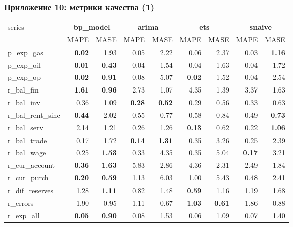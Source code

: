 \documentclass[9pt]{beamer}
\begin{document}
\begin{frame}
\frametitle{Приложение 10: метрики качества (1)}	
	\begin{center}
		\footnotesize
		\begin{tabular}{l|rr|rr|rr|rr}
			\toprule
			\multirow{2}{*}{series}&\multicolumn{2}{c|}{\textbf{bp\_model}}&\multicolumn{2}{c|}{\textbf{arima}}&\multicolumn{2}{c|}{\textbf{ets}}&\multicolumn{2}{c}{\textbf{snaive}}\\
			
			&MAPE & MASE & MAPE & MASE & MAPE & MASE & MAPE & MASE \\ 
			\midrule
			p\_exp\_gas & \textbf{0.02} & 1.93 & 0.05 & 2.22 & 0.06 & 2.37 & 0.03 & \textbf{1.16} \\ 
			p\_exp\_oil & \textbf{0.01} & \textbf{0.43} & 0.04 & 1.54 & 0.04 & 1.63 & 0.04 & 1.72 \\ 
			p\_exp\_op & \textbf{0.02} & \textbf{0.91} & 0.08 & 5.07 & \textbf{0.02} & 1.52 & 0.04 & 2.54 \\ 
			r\_bal\_fin & \textbf{1.61} & \textbf{0.96} & 2.73 & 1.07 & 4.35 & 1.39 & 3.37 & 1.63 \\ 
			r\_bal\_inv & 0.36 & 1.09 & \textbf{0.28} & \textbf{0.52} & 0.29 & 0.56 & 0.33 & 0.63 \\ 
			r\_bal\_rent\_sinc & \textbf{0.44} & 2.02 & 0.55 & 0.77 & 0.58 & 0.84 & 0.49 & \textbf{0.73} \\ 
			r\_bal\_serv & 2.14 & 1.21 & 0.26 & 1.26 & \textbf{0.13} & 0.62 & 0.22 & \textbf{1.06} \\ 
			r\_bal\_trade & 0.17 & 1.72 & \textbf{0.14} & \textbf{1.31} & 0.35 & 3.26 & 0.25 & 2.39 \\ 
			r\_bal\_wage & 0.25 & \textbf{1.53} & 0.33 & 4.35 & 0.35 & 5.04 & \textbf{0.17} & 3.21 \\ 
			r\_cur\_account & \textbf{0.36} & \textbf{1.63} & 5.83 & 2.86 & 4.36 & 2.31 & 2.49 & 1.84 \\ 
			r\_cur\_purch & \textbf{0.20} & \textbf{0.59} & 1.13 & 6.03 & 1.00 & 5.43 & 0.48 & 2.41 \\ 
			r\_dif\_reserves & 1.28 & \textbf{1.11} & 0.82 & 1.48 & \textbf{0.59} & 1.16 & 1.19 & 1.68 \\ 
			r\_errors & 1.90 & 0.95 & 1.11 & 0.67 & \textbf{1.03} & \textbf{0.61} & 1.86 & 0.88 \\ 
			r\_exp\_all & \textbf{0.05} & \textbf{0.90} & 0.08 & 1.53 & 0.06 & 1.09 & 0.07 & 1.40 \\ 
			\bottomrule
		\end{tabular}
		\captionsetup{justification=centering,margin=2cm}
		\label{tab:4}
	\end{center}

\end{frame}
\end{document}

